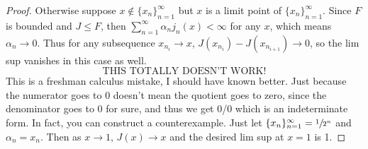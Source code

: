\documentclass[letterpaper]{article}
\begin{document}
\begin{enumerate}
\begin{enumerate}
\begin{proof}
		Otherwise suppose $x\not\in\{x_n\}_{n=1}^\infty$ but $x$ is a limit point of $\{x_n\}_{n=1}^\infty$. Since $F$ is bounded and $J\leq F$, then $\sum_{n=1}^\infty\alpha_nj_n(x)<\infty$ for any $x$, which means $\alpha_n\to0$. Thus for any subsequence $x_{n_i}\to x$, $J(x_{n_i})-J(x_{n_{i+1}})\to0$, so the lim sup vanishes in this case as well.		
		$$\text{THIS TOTALLY DOESN'T WORK!}$$
		This is a freshman calculus mistake, I should have known better. Just because the numerator goes to 0 doesn't mean the quotient goes to zero, since the denominator goes to 0 for sure, and thus we get 0/0 which is an indeterminate form. In fact, you can construct a counterexample. 
		Just let $\{x_n\}_{n=1}^\infty=\sfrac{1}{2^n}$ and $\alpha_n=x_n$. Then as $x\to 1$, $J(x)\to x$ and the desired lim sup at $x=1$ is 1. 
		\end{proof}
	\end{enumerate}

\end{enumerate}
\end{document}

